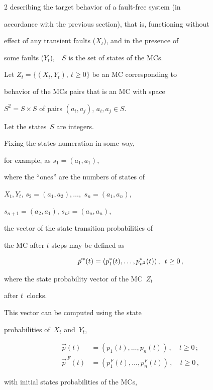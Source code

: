 \begin{multicols}{2}
describing the target behavior of a fault-free system  (in

accordance with the previous section), that is, functioning without

effect of any transient faults ($X_t$), and in the presence of

some faults ($Y_t$),\ \ $S$ is the set of states of the MCs.



Let $Z_t=\{(X_t,Y_t), \ t\ge0\}$ be an MC corresponding to

behavior of the MCs pairs that is an MC with space

$S^2=S\times S$ of pairs $(a_i,a_j)$, $a_i,a_j\in S$.



Let the states~$S$ are integers.

Fixing  the states numeration in  some way,

for example, as $s_1=(a_1,a_1)$,

where the ``ones'' are the numbers of states of

$X_t,Y_t$,  $s_2=(a_1,a_2),\ldots,$  $s_n=(a_1,a_n)$,

$s_{n+1}=(a_2,a_1)$, $s_{n^2}=(a_n,a_n)$,

the vector of the state transition probabilities of

the MC after $t$ steps may be defined as

$$

\vec p^{\,*}(t)=(p_{1}^*(t),\ldots,p_{n^2}^*(t))\,,

\enskip t\ge 0\,,

$$

where the state probability vector of the MC~$Z_t$

after $t$~clocks.

 This vector can be computed using the state

probabilities of~$X_t$ and~$Y_t$,

\begin{align*}

\vec p(t)&=(p_{1}(t),\ldots,p_{n}(t))\,,

\quad  t\ge 0\,;

\\

\vec p^{\,F}(t)&=(p_{1}^F(t),\ldots,p_{n}^F(t))\,,

\quad t\ge 0\,,

\end{align*}

with initial  states probabilities of the MCs,


\end{multicols}
